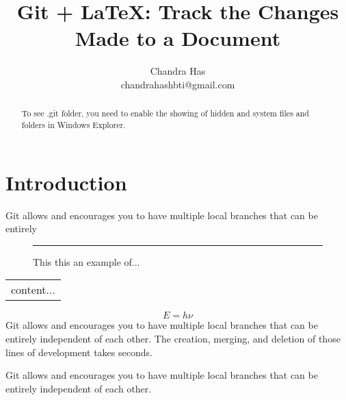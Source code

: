 \documentclass[a4paper,12pt]{article}
\title{Git + \LaTeX: Track the Changes Made to a Document}
\author{Chandra Has\\ \small chandrahashbti@gmail.com}\date{}
\begin{document}
\maketitle	

\begin{abstract}
To see .git folder, you need to enable the showing of hidden and system files and folders in Windows Explorer.
\end{abstract}

\section{Introduction}
Git allows and encourages you to have multiple local branches that can be entirely 

\begin{figure}[!h]\centering\rule{3cm}{3cm}
	\caption{This this an example of...}
\end{figure}

\begin{tabular}{c}
	content...
\end{tabular}


\begin{equation}E=h\nu\end{equation}
Git allows and encourages you to have multiple local branches that can be entirely independent of each other. The creation, merging, and deletion of those lines of development takes seconds.

Git allows and encourages you to have multiple local branches that can be entirely independent of each other. 
\end{document}
